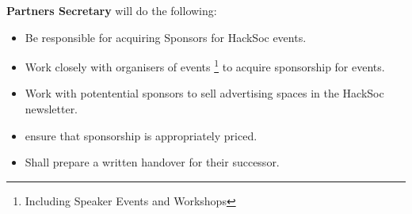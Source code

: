 \begin{subclause}
	\textbf{Partners Secretary} will do the following:
	\begin{itemize}[label=--,topsep=0em,itemsep=0em]
		\item Be responsible for acquiring Sponsors for HackSoc events.
		\item Work closely with organisers of events \footnote{Including Speaker Events and Workshops} to acquire sponsorship for events.
		\item Work with potentential sponsors to sell advertising spaces in the HackSoc newsletter.
		\item ensure that sponsorship is appropriately priced.
		\item Shall prepare a written handover for their successor.
	\end{itemize}
\end{subclause}

